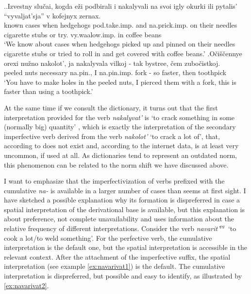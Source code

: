 \ex.\label{ex:nakalyvat}\ag.Izvestny slu\v{c}ai, kogda e\v{z}i podbirali i nakalyvali na svoi igly okurki ili pytalis' ``vyvaljat'sja'' v kofejnyx zernax.\\
known cases when hedgehogs pod.take.imp. and na.prick.imp. on their needles {cigarette stubs} or try. vy.waalow.imp. in coffee beans\\
\trans `We know about cases when hedgehogs picked up and pinned on their needles cigarette stubs or tried to roll in and get covered with coffee beans.'
\bg.O\v{c}i\v{s}\v{c}ennye orexi nu\v{z}no nakolot', ja nakalyvala vilkoj - tak bystree, \v{c}em zubo\v{c}istkoj.\\
peeled nuts necessary na.pin., I na.pin.imp. fork - so faster, then toothpick\\
\trans `You have to make holes in the peeled nuts, I pierced them with a fork, this is faster than using a toothpick.'\\

At the same time if we consult the dictionary, it turns out that the first interpretation provided for the verb \textit{nakalyvat'} is `to crack something in some (normally big) quantity' \citep{Efremova:00}, which is exactly the interpretation of the secondary imperfective verb derived from the verb \textit{nakolot'} `to crack a lot of', that, according to \citet{Svenonius:04b} does not exist and, according to the internet data, is at least very uncommon, if used at all. As dictionaries tend to represent an outdated norm, this phenomenon can be related to the norm shift we have discussed above.

I want to emphasize that the imperfectivization of verbs prefixed with the cumulative \textit{na-} is available in a larger number of cases than seems at first sight. I have sketched a possible explanation why its formation is dispreferred in case a spatial interpretation of the derivational base is available, but this explanation is about preference, not complete unavailability and uses information about the relative frequency of different interpretations. Consider the verb \textit{navarit'}$^{\textsc{pf}}$ `to cook a lot/to weld something'. For the perfective verb, the cumulative interpretation is the default one, but the spatial interpretation is accessible in the relevant context. After the attachment of the imperfective suffix, the spatial interpretation (see example \ref{ex:navarivat1}) is the default. The cumulative interpretation is dispreferred, but possible and easy to identify, as illustrated by \ref{ex:navarivat2}.

